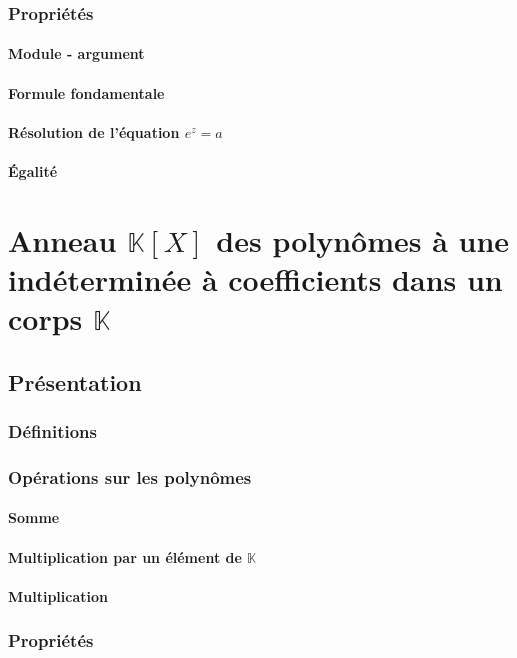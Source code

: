\documentclass[12pt,a4paper,french]{book}
\begin{document}
		\subsection{Propriétés}
			\subsubsection{Module - argument}
			\subsubsection{Formule fondamentale}
			\subsubsection{Résolution de l'équation $e^{z} = a$}
			\subsubsection{Égalité}
			
		
\chapter{Anneau $\mathbb{K}[X]$ des polynômes à une indéterminée à coefficients dans un corps $\mathbb{K}$}
	\section{Présentation}
		\subsection{Définitions}
		\subsection{Opérations sur les polynômes}
			\subsubsection{Somme}
			\subsubsection{Multiplication par un élément de $\mathbb{K}$}
			\subsubsection{Multiplication}
		\subsection{Propriétés}
\end{document}
